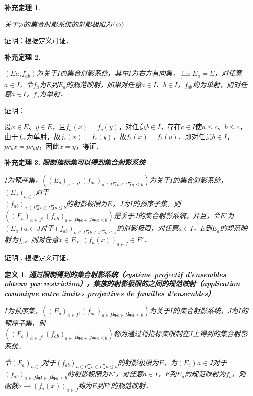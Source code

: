 \documentclass[12pt, a4paper, oneside]{book}
\newtheorem{cor}{补充定理}
\newtheorem{de}{定义}
\begin{document}
			\begin{cor}\label{cor413}
				\hfill\par
				关于$\varnothing$的集合射影系统的射影极限为$\{\varnothing\}$．
			\end{cor}
			证明：根据定义可证．
			
			\begin{cor}\label{cor414}
				\hfill\par
				$(Ea, f_{ab})$为关于$I$的集合射影系统，其中$I$为右方有向集，$\lim\limits_\gets E_a=E$，对任意$a\in I$，令$f_a$为$E$到$E_a$的规范映射，如果对任意$a\in I$、$b\in I$，$f_{ab}$均为单射，则对任意$a\in I$，$f_a$为单射．
			\end{cor}
			证明：
			\par
			设$x\in E$、$y\in E$，且$f_a(x)=f_a(y)$，对任意$b\in I$，存在$c\in I$使$a\leq c$、$b\leq c$，由于$f_{ac}$为单射，故$f_c(x)=f_c(y)$，故$f_b(x)=f_b(y)$．即对任意$b\in I$，$pr_bx=pr_by$，因此$x=y$，得证．
			
			\begin{cor}\label{cor415}
				\textbf{限制指标集可以得到集合射影系统}
				\par
				$I$为预序集，$((E_a)_{a\in I}, (f_{ab})_{a\in I\text{与}b\in I\text{与}a\leq b})$为关于$I$的集合射影系统，$(E_a)_{a\in I}$对于\\$(f_{ab})_{a\in I\text{与}b\in I\text{与}a\leq b}$的射影极限为$E$，$J$为$I$的预序子集，则$((E_a)_{a\in J}, (f_{ab})_{a\in J\text{与}b\in J\text{与}a\leq b})$是关于$J$的集合射影系统，并且，令$E'$为$(E_a){a\in J}$对于$(f_{ab})_{a\in J\text{与}b\in J\text{与}a\leq b}$的射影极限，对任意$a\in I$，$E$到$E_a$的规范映射为$f_a$，则对任意$x\in E$，$(f_a(x))_{a\in J}\in E'$．
			\end{cor}
			证明：根据定义可证．
			
			\begin{de}
				\textbf{通过限制得到的集合射影系统（système projectif d'ensembles obtenu par restriction），集族的射影极限的之间的规范映射（application canonique entre limites projectives de familles d'ensembles）}
				\par
				$I$为预序集，$((E_a)_{a\in I}, (f_{ab})_{a\in I\text{与}b\in I\text{与}a\leq b})$为关于$I$的集合射影系统，$J$为$I$的预序子集，则\\$((E_a)_{a\in J}, (f_{ab})_{a\in J\text{与}b\in J\text{与}a\leq b})$称为通过将指标集限制在$J$上得到的集合射影系统．
				\par
				令$(E_a)_{a\in I}$对于$(f_{ab})_{a\in I\text{与}b\in I\text{与}a\leq b}$的射影极限为$E$，为$(E_a){a\in J}$对于$(f_{ab})_{a\in J\text{与}b\in J\text{与}a\leq b}$的射影极限为$E'$，对任意$a\in I$，$E$到$E_a$的规范映射为$f_a$，则函数$x\to (f_a(x))_{a\in J}$称为$E$到$E'$的规范映射．
			\end{de}
			
\end{document}
